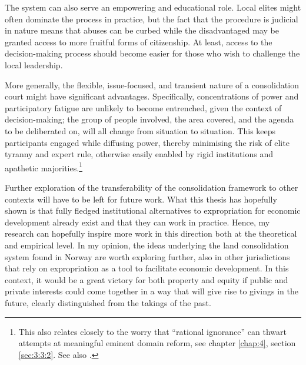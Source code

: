 {%

The system can also serve an empowering and educational role. Local elites might often dominate the process in practice, but the fact that the procedure is judicial in nature means that abuses can be curbed while the disadvantaged may be granted access to more fruitful forms of citizenship. At least, access to the decision-making process should become easier for those who wish to challenge the local leadership.

More generally, the flexible, issue-focused, and transient nature of a consolidation court might have significant advantages. Specifically, concentrations of power and participatory fatigue are unlikely to become entrenched, given the context of decision-making; the group of people involved, the area covered, and the agenda to be deliberated on, will all change from situation to situation. This keeps participants engaged while diffusing power, thereby minimising the risk of elite tyranny and expert rule, otherwise easily enabled by rigid institutions and apathetic majorities.\footnote{This also relates closely to the worry that ``rational ignorance'' can thwart attempts at meaningful eminent domain reform, see chapter \ref{chap:4}, section \ref{sec:3:3:2}. See also \cite{somin09}.}

Further exploration of the transferability of the consolidation framework to other contexts will have to be left for future work. What this thesis has hopefully shown is that fully fledged institutional alternatives to expropriation for economic development already exist and that they can work in practice. Hence, my research can hopefully inspire more work in this direction both at the theoretical and empirical level. In my opinion, the ideas underlying the land consolidation system found in Norway are worth exploring further, also in other jurisdictions that rely on expropriation as a tool to facilitate economic development. In this context, it would be a great victory for both property and equity if public and private interests could come together in a way that will give rise to givings in the future, clearly distinguished from the takings of the past.
}